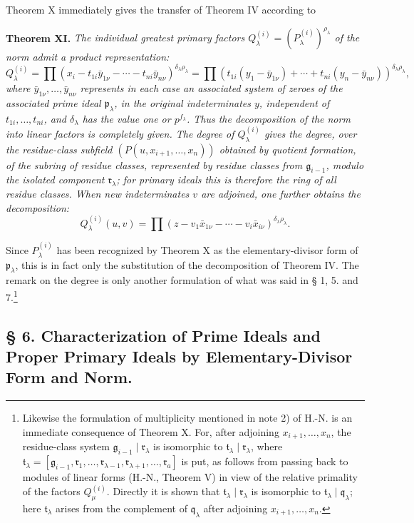 \documentclass[11pt]{article}
\providecommand{\frakp}{\mathfrak p}
\providecommand{\frakq}{\mathfrak q}
\providecommand{\frakr}{\mathfrak r}
\providecommand{\frakg}{\mathfrak g}
\providecommand{\frakt}{\mathfrak t}
\providecommand{\frakp}{\mathfrak p}
\providecommand{\frakp}{\mathfrak p}
\providecommand{\frakq}{\mathfrak q}
\providecommand{\frakr}{\mathfrak r}
\begin{document}
Theorem X immediately gives the transfer of Theorem IV according to

\textbf{Theorem XI.} \emph{The individual greatest primary factors $Q_\lambda^{(i)}=(P_\lambda^{(i)})^{\rho_\lambda}$ of the norm admit a product representation:}
\[
 Q_\lambda^{(i)}=\prod (x_i-t_{1i}\bar y_{1\nu}-\cdots-t_{ni}\bar y_{n\nu})^{\delta_\lambda\rho_\lambda}
 =\prod (t_{1i}(y_1-\bar y_{1\nu})+\cdots+t_{ni}(y_n-\bar y_{n\nu}))^{\delta_\lambda\rho_\lambda},
\]
\emph{where $\bar y_{1\nu},\ldots,\bar y_{n\nu}$ represents in each case an associated system of zeroes of the associated prime ideal $\frakp_\lambda$, in the original indeterminates $y$, independent of $t_{1i},\ldots,t_{ni}$, and $\delta_\lambda$ has the value one or $p^{f_\lambda}$. Thus the decomposition of the norm into linear factors is completely given. The degree of $Q_\lambda^{(i)}$ gives the degree, over the residue-class subfield $(P(u,x_{i+1},\ldots,x_n))$ obtained by quotient formation, of the subring of residue classes, represented by residue classes from $\frakg_{i-1}$, modulo the isolated component $\frakr_\lambda$; for primary ideals this is therefore the ring of all residue classes. When new indeterminates $v$ are adjoined, one further obtains the decomposition:}
\[
 Q_\lambda^{(i)}(u,v)=\prod (z-v_1\bar x_{1\nu}-\cdots-v_i\bar x_{i\nu})^{\delta_\lambda\rho_\lambda}.
\]

Since $P_\lambda^{(i)}$ has been recognized by Theorem X as the elementary-divisor form of $\frakp_\lambda$, this is in fact only the substitution of the decomposition of Theorem IV. The remark on the degree is only another formulation of what was said in § 1, 5. and 7.\footnote{Likewise the formulation of multiplicity mentioned in note 2) of H.-N. is an immediate consequence of Theorem X. For, after adjoining $x_{i+1},\ldots,x_n$, the residue-class system $\frakg_{i-1}\mid\frakr_\lambda$ is isomorphic to $\frakt_\lambda\mid\frakr_\lambda$, where $\frakt_\lambda=[\frakg_{i-1},\frakr_1,\ldots,\frakr_{\lambda-1},\frakr_{\lambda+1},\ldots,\frakr_a]$ is put, as follows from passing back to modules of linear forms (H.-N., Theorem V) in view of the relative primality of the factors $Q_\mu^{(i)}$. Directly it is shown that $\frakt_\lambda\mid\frakr_\lambda$ is isomorphic to $\frakt_\lambda\mid\frakq_\lambda$; here $\frakt_\lambda$ arises from the complement of $\frakq_\lambda$ after adjoining $x_{i+1},\ldots,x_n$.}

\subsection*{§ 6. Characterization of Prime Ideals and Proper Primary Ideals by Elementary-Divisor Form and Norm.}
\end{document}
